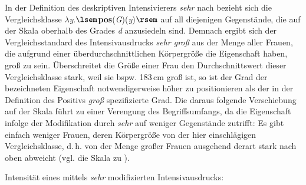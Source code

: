 \largerpage
\noindent In der Definition des deskriptiven Intensivierers \textit{sehr} nach {\citet[132f.]{Gutzmann.2019a}} bezieht sich die Vergleichsklasse $\lambda$\textit{y}.$\lsem$\textbf{pos}(\textit{G})(\textit{y})$\rsem$ auf all diejenigen Gegenstände, die auf der Skala oberhalb des {Grades \textit{d}} anzusiedeln sind. Demnach ergibt sich der Vergleichsstandard des Intensivausdrucks \textit{sehr groß} aus der Menge aller Frauen, die aufgrund einer überdurchschnittlichen Körpergröße die Eigenschaft haben, groß zu sein. Überschreitet die Größe einer Frau den Durchschnittswert dieser Vergleichsklasse stark, weil sie bspw. 183\,cm groß ist, so ist der Grad der bezeichneten Eigenschaft notwendigerweise höher zu positionieren als der in der Definition des Positivs \textit{groß} spezifizierte Grad. Die daraus folgende Verschiebung auf der Skala führt zu einer Verengung des Begriffsumfangs, da die Eigenschaft infolge der Modifikation durch \textit{sehr} auf weniger Gegenstände zutrifft: Es gibt einfach weniger Frauen, deren Körpergröße von der hier einschlägigen Vergleichsklasse, d.\,h. von der Menge großer Frauen ausgehend derart stark nach oben abweicht (vgl. die Skala {zu )}.


\ea  Intensität eines mittels \textit{sehr} modifizierten Intensivausdrucks: \medskip

\centering \label{ska}
\z

